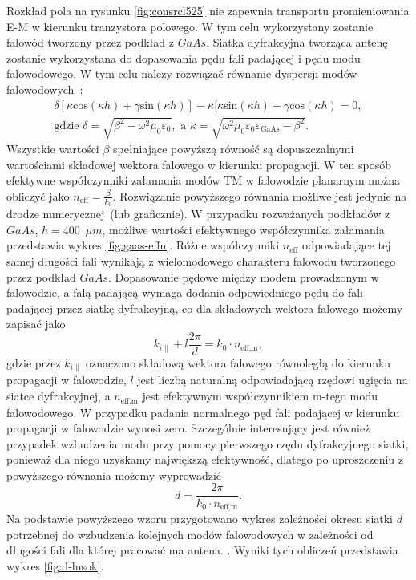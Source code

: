 Rozkład pola na rysunku \ref{fig:consrcl525} nie zapewnia transportu promieniowania E-M w kierunku tranzystora polowego. W tym celu wykorzystany zostanie falowód tworzony przez podkład z $GaAs$. Siatka dyfrakcyjna tworząca antenę zostanie wykorzystana do dopasowania pędu fali padającej i pędu modu falowodowego. W tym celu należy rozwiązać równanie dyspersji modów falowodowych~\cite{petykiewicz1989podstawy}:
\begin{equation}
	\begin{gathered}
	\delta [ \kappa \textrm{cos}(\kappa h) + \gamma\textrm{sin}(\kappa h) ] - \kappa [ \kappa \textrm{sin}(\kappa h) - \gamma \textrm{cos}(\kappa h) = 0,\\
	\textrm{gdzie }\delta=\sqrt{\beta^2-\omega^2\mu_0\varepsilon_0},\textrm{ a }\kappa=\sqrt{\omega^2\mu_0 \varepsilon_0 \varepsilon_{\textrm{GaAs}}-\beta^2}.
	\end{gathered}
\end{equation}
Wszystkie wartości $\beta$ spełniające powyższą równość są dopuszczalnymi wartościami składowej wektora falowego w kierunku propagacji. W ten sposób efektywne współczynniki załamania modów TM w falowodzie planarnym można obliczyć jako $n_{\textrm{eff}}=\frac{\beta}{k_0}$. Rozwiązanie powyższego równania możliwe jest jedynie na drodze numerycznej~(lub graficznie). W przypadku rozważanych podkładów z $GaAs$, $h=400$~$\mu m$, możliwe wartości efektywnego współczynnika załamania przedstawia wykres \ref{fig:gaas-effn}. Różne współczynniki $n_{\textrm{eff}}$ odpowiadające tej samej długości fali wynikają z wielomodowego charakteru falowodu tworzonego przez podkład $GaAs$. Dopasowanie pędowe między modem prowadzonym w falowodzie, a falą padającą wymaga dodania odpowiedniego pędu do fali padającej przez siatkę dyfrakcyjną, co dla składowych wektora falowego możemy zapisać jako
\[
k_{i \parallel} + l \frac{2\pi}{d} = k_0 \cdot n_{\textrm{eff,m}}, 
\]
gdzie przez $k_{i \parallel}$ oznaczono składową wektora falowego równoległą do kierunku propagacji w falowodzie, $l$ jest liczbą naturalną odpowiadającą rzędowi ugięcia na siatce dyfrakcyjnej, a $n_{\textrm{eff,m}}$ jest efektywnym współczynnikiem m-tego modu falowodowego. W przypadku padania normalnego pęd fali padającej w kierunku propagacji w falowodzie wynosi zero. Szczególnie interesujący jest również przypadek wzbudzenia modu przy pomocy pierwszego rzędu dyfrakcyjnego siatki, ponieważ dla niego uzyskamy największą efektywność, dlatego po uproszczeniu z powyższego równania możemy wyprowadzić
\begin{equation}
d=\frac{2 \pi}{k_0 \cdot n_{\textrm{eff,m}}}.
\label{eq:d-do-wzbudzenia}
\end{equation}
Na podstawie powyższego wzoru przygotowano wykres zależności okresu siatki $d$ potrzebnej do wzbudzenia kolejnych modów falowodowych w zależności od długości fali dla której pracować ma antena. . Wyniki tych obliczeń przedstawia wykres \ref{fig:d-lusok}.

